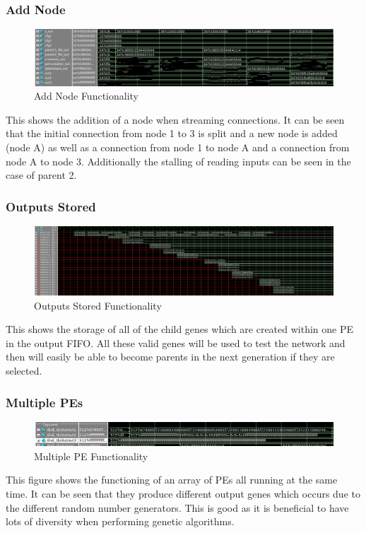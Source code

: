 \documentclass[preprint,pre,floats,aps,amsmath,amssymb]{revtex4}
\begin{document}
\newpage
\subsubsection{Add Node}

\begin{figure}[htb!]
	\includegraphics[width=\textwidth]{AddNode+ParentB_Stall}
	\caption{Add Node Functionality}
\end{figure}
\FloatBarrier
This shows the addition of a node when streaming connections. It can be seen that the initial connection from node 1 to 3 is split and a new node is added (node A) as well as a connection from node 1 to node A and a connection from node A to node 3. Additionally the stalling of reading inputs can be seen in the case of parent 2.

\subsubsection{Outputs Stored}

\begin{figure}[htb!]
	\includegraphics[width=\textwidth]{OutputsStored}
	\caption{Outputs Stored Functionality}
\end{figure}
\FloatBarrier
This shows the storage of all of the child genes which are created within one PE in the output FIFO. All these valid genes will be used to test the network and then will easily be able to become parents in the next generation if they are selected.

\newpage
\subsubsection{Multiple PEs}

\begin{figure}[htb!]
	\includegraphics[width=\textwidth]{Multiple_PE}
	\caption{Multiple PE Functionality}
\end{figure}
\FloatBarrier
This figure shows the functioning of an array of PEs all running at the same time. It can be seen that they produce different output genes which occurs due to the different random number generators. This is good as it is beneficial to have lots of diversity when performing genetic algorithms.
\end{document}
